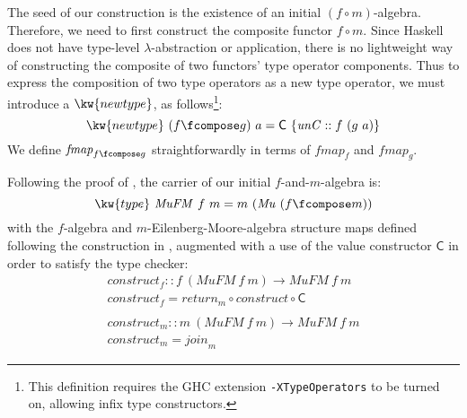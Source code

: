 The seed of our construction is the existence of an initial $(f \circ
m)$-algebra. Therefore, we need to first construct the composite
functor $f \circ m$. Since Haskell does not have type-level
$\lambda$-abstraction or application, there is no lightweight way of
constructing the composite of two functors' type operator
components. Thus to express the composition of two type operators as
a new type operator, we must introduce a $\kw{newtype}$, as
follows\footnote{This definition requires the GHC extension
  \texttt{-XTypeOperators} to be turned on, allowing infix type
  constructors.}:
\begin{displaymath}
  \kw{newtype}~(f \fcompose g)~a = \mathsf{C}~\{\mathit{unC} :: f~(g~a) \}
\end{displaymath}
We define $\mathit{fmap}_{f\fcompose g}$ straightforwardly in terms of
$\mathit{fmap}_f$ and $\mathit{fmap}_g$.

Following the proof of , the
carrier of our initial $f$-and-$m$-algebra is:
\begin{displaymath}
  \kw{type}~\mathit{MuFM}~f~m = m~(\mathit{Mu}~(f \fcompose m))
\end{displaymath}
with the $f$-algebra and $m$-Eilenberg-Moore-algebra structure maps
defined following the construction in
, augmented with a use of the
value constructor $\mathsf{C}$ in order to satisfy the type checker:
\begin{displaymath}
  \begin{array}{l}
    \mathit{construct}_f :: f~(\mathit{MuFM}~f~m) \to \mathit{MuFM}~f~m \\
    \mathit{construct}_f = \mathit{return}_m \circ \mathit{construct} \circ \mathsf{C} \\
    \\
    \mathit{construct}_m :: m~(\mathit{MuFM}~f~m) \to \mathit{MuFM}~f~m \\
    \mathit{construct}_m = \mathit{join}_m
  \end{array}
\end{displaymath}

